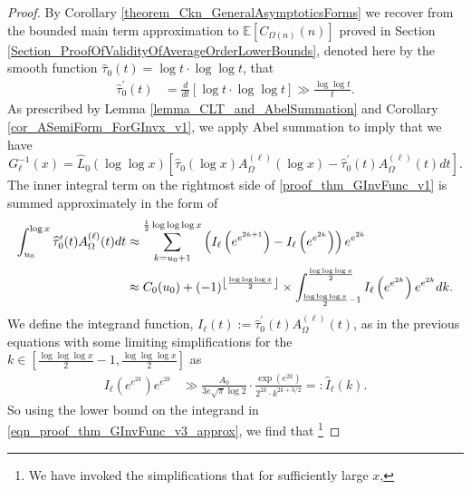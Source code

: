 \documentclass[11pt,reqno,a4letter]{article}
\numberwithin{figure}{section}
\numberwithin{table}{section}
\newcommand{\Floor}[2]{\ensuremath{\left\lfloor \frac{#1}{#2} \right\rfloor}}
\theoremstyle{plain}
\numberwithin{theorem}{section}
\theoremstyle{definition}
\newcommand{\SuccSim}[0]{\overset{_{\scriptsize{\blacktriangle}}}{\succsim}}
\renewcommand{\SuccSim}[0]{\ensuremath{\gg}}
\begin{document}
\begin{proof}
By Corollary \ref{theorem_Ckn_GeneralAsymptoticsForms} 
we recover from the bounded main term approximation to $\mathbb{E}[C_{\Omega(n)}(n)]$ proved in 
Section \ref{Section_ProofOfValidityOfAverageOrderLowerBounds}, denoted here by the smooth function 
$\widehat{\tau}_0(t) = \log t \cdot \log\log t$, that 
\begin{align*} 
\widehat{\tau}_0^{\prime}(t) & = \frac{d}{dt}\left[ 
     \log t \cdot \log\log t 
     \right] \SuccSim \frac{\log\log t}{t}. 
\end{align*} 
As prescribed by Lemma \ref{lemma_CLT_and_AbelSummation} and Corollary \ref{cor_ASemiForm_ForGInvx_v1}, 
we apply Abel summation to imply that we have 
\begin{equation} 
\label{proof_thm_GInvFunc_v1} 
G_{\ell}^{-1}(x) = \widehat{L}_0(\log\log x) \left[
     \widehat{\tau}_0(\log x) A_{\Omega}^{(\ell)}(\log x) - 
     \widehat{\tau}_0^{\prime}(t) A_{\Omega}^{(\ell)}(t) dt\right]. 
\end{equation} 
The inner integral term on the rightmost side of \eqref{proof_thm_GInvFunc_v1} 
is summed approximately in the form of 
\begin{align} 
\label{eqn_proof_thm_GInvFunc_v3_approx} 
\int_{u_0}^{\log x} \widehat{\tau}_0^{\prime}(t) A_{\Omega}^{(\ell)}(t) dt & \approx 
     \sum_{k=u_0+1}^{\frac{1}{2}\log\log\log x} \left( 
     I_{\ell}\left(e^{e^{2k+1}}\right) - 
     I_{\ell}\left(e^{e^{2k}}\right) 
     \right) e^{e^{2k}} \\ 
\notag 
     & \approx 
     C_0(u_0) + 
     (-1)^{\Floor{\log\log\log x}{2}} \times 
     \int_{\frac{\log\log\log x}{2}-1}^{\frac{\log\log\log x}{2}} 
     I_{\ell}\left(e^{e^{2k}}\right) 
     e^{e^{2k}} dk. 
\end{align} 
We define the integrand function, 
$I_{\ell}(t) := \widehat{\tau}_0^{\prime}(t) A_{\Omega}^{(\ell)}(t)$, 
as in the previous equations with some limiting simplifications for the 
$k \in \left[\frac{\log\log\log x}{2}-1, \frac{\log\log\log x}{2}\right]$ as 
\begin{align} 
\label{eqn_proof_thm_GInvFunc_v3_approx} 
I_{\ell}\left(e^{e^{2k}}\right) e^{e^{2k}}& \SuccSim 
     \frac{A_0}{3e \sqrt{\pi} \log 2} \cdot \frac{\exp\left(e^{2k}\right)}{2^{2k} \cdot k^{2k+3/2}} 
     =: \widehat{I}_{\ell}(k). 
\end{align} 
So using the lower bound on the integrand in \eqref{eqn_proof_thm_GInvFunc_v3_approx}, 
we find that \footnote{ 
     We have invoked the simplifications that for sufficiently large $x$, 
}
\end{proof}
\end{document}
